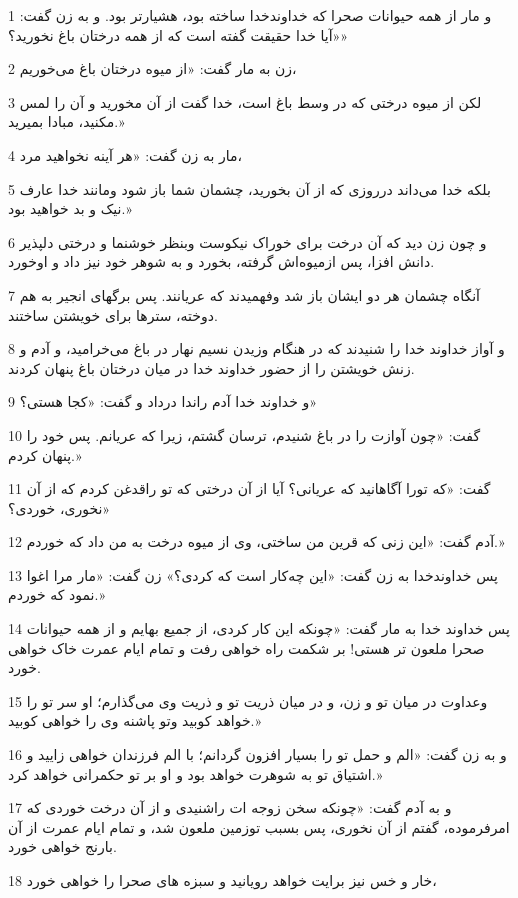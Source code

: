 \par 1 و مار از همه حیوانات صحرا که خداوندخدا ساخته بود، هشیارتر بود. و به زن گفت: «آیا خدا حقیقت گفته است که از همه درختان باغ نخورید؟»
\par 2 زن به مار گفت: «از میوه درختان باغ می‌خوریم،
\par 3 لکن از میوه درختی که در وسط باغ است، خدا گفت از آن مخورید و آن را لمس مکنید، مبادا بمیرید.»
\par 4 مار به زن گفت: «هر آینه نخواهید مرد،
\par 5 بلکه خدا می‌داند درروزی که از آن بخورید، چشمان شما باز شود ومانند خدا عارف نیک و بد خواهید بود.»
\par 6 و چون زن دید که آن درخت برای خوراک نیکوست وبنظر خوشنما و درختی دلپذیر دانش افزا، پس ازمیوه‌اش گرفته، بخورد و به شوهر خود نیز داد و اوخورد.
\par 7 آنگاه چشمان هر دو ایشان باز شد وفهمیدند که عریانند. پس برگهای انجیر به هم دوخته، سترها برای خویشتن ساختند.
\par 8 و آواز خداوند خدا را شنیدند که در هنگام وزیدن نسیم نهار در باغ می‌خرامید، و آدم و زنش خویشتن را از حضور خداوند خدا در میان درختان باغ پنهان کردند.
\par 9 و خداوند خدا آدم راندا در‌داد و گفت: «کجا هستی؟»
\par 10 گفت: «چون آوازت را در باغ شنیدم، ترسان گشتم، زیرا که عریانم. پس خود را پنهان کردم.»
\par 11 گفت: «که تورا آگاهانید که عریانی؟ آیا از آن درختی که تو راقدغن کردم که از آن نخوری، خوردی؟»
\par 12 آدم گفت: «این زنی که قرین من ساختی، وی از میوه درخت به من داد که خوردم.»
\par 13 پس خداوندخدا به زن گفت: «این چه‌کار است که کردی؟» زن گفت: «مار مرا اغوا نمود که خوردم.»
\par 14 پس خداوند خدا به مار گفت: «چونکه این کار کردی، از جمیع بهایم و از همه حیوانات صحرا ملعون تر هستی! بر شکمت راه خواهی رفت و تمام ایام عمرت خاک خواهی خورد.
\par 15 وعداوت در میان تو و زن، و در میان ذریت تو و ذریت وی می‌گذارم؛ او سر تو را خواهد کوبید وتو پاشنه وی را خواهی کوبید.»
\par 16 و به زن گفت: «الم و حمل تو را بسیار افزون گردانم؛ با الم فرزندان خواهی زایید و اشتیاق تو به شوهرت خواهد بود و او بر تو حکمرانی خواهد کرد.»
\par 17 و به آدم گفت: «چونکه سخن زوجه ات راشنیدی و از آن درخت خوردی که امرفرموده، گفتم از آن نخوری، پس بسبب توزمین ملعون شد، و تمام ایام عمرت از آن بارنج خواهی خورد.
\par 18 خار و خس نیز برایت خواهد رویانید و سبزه های صحرا را خواهی خورد،
